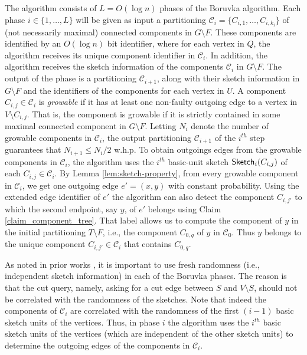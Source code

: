 The algorithm consists of $L=O(\log n)$ phases of the Boruvka algorithm. Each phase $i \in \{1,\ldots, L\}$ will be given as input a partitioning $\mathcal{C}_i=\{C_{i,1}, \ldots, C_{i,k_i}\}$ of (not necessarily maximal) connected components in $G \setminus F$.
These components are identified by an $O(\log n)$ bit identifier, where for each vertex in $Q$, the algorithm receives its unique component identifier in  $\mathcal{C}_i$. In addition, the algorithm receives the sketch information of the components $\mathcal{C}_i$ in $G \setminus F$. The output of the phase is a partitioning $\mathcal{C}_{i+1}$, along with their sketch information in $G \setminus F$ and the identifiers of the components for each vertex in $U$. A component $C_{i,j} \in \mathcal{C}_i$ is \emph{growable} if it has at least one non-faulty outgoing edge to a vertex in $V \setminus C_{i,j}$. That is, the component is growable if it is strictly contained in some maximal connected component in $G \setminus F$. Letting $N_i$ denote the number of growable components in $\mathcal{C}_i$, the output partitioning $\mathcal{C}_{i+1}$ of the $i^{th}$ step guarantees that $N_{i+1}\leq N_i /2$ w.h.p. To obtain outgoings edges from the growable components in $\mathcal{C}_i$, the algorithm uses the $i^{th}$ basic-unit sketch $\mathsf{Sketch}_i(C_{i,j})$ of each $C_{i,j} \in \mathcal{C}_i$. By Lemma \ref{lem:sketch-property}, from every growable component in $\mathcal{C}_i$, we get one outgoing edge $e'=(x,y)$ with constant probability. Using the extended edge identifier of $e'$ the algorithm can also detect the component $C_{i,j'}$ to which the second endpoint, say $y$, of $e'$ belongs using Claim \ref{claim_component_tree}. %
That label allows us to compute the component of $y$ in the initial partitioning $T \setminus F$, i.e., the component $C_{0,q}$ of $y$ in $\mathcal{C}_0$. Thus $y$ belongs to the unique component $C_{i,j'} \in \mathcal{C}_i$ that contains 
$C_{0,q}$. 



As noted in prior works \cite{ahn2012analyzing,kapron2013dynamic,DuanConnectivityArxiv16}, it is important to use fresh randomness (i.e., independent sketch information) in each of the Boruvka phases. The reason is that the cut query, namely, asking for a cut edge between $S$ and $V \setminus S$, should not be correlated with the randomness of the sketches. Note that indeed the components of $\mathcal{C}_i$ are correlated with the randomness of the first $(i-1)$ basic sketch units of the vertices. Thus, in phase $i$ the algorithm uses the $i^{th}$ basic sketch units of the vertices (which are independent of the other sketch units) to determine the outgoing edges of the components in $\mathcal{C}_i$.

